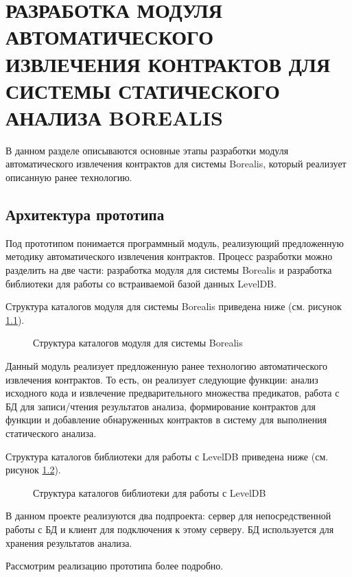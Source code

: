 \chapter{РАЗРАБОТКА МОДУЛЯ АВТОМАТИЧЕСКОГО ИЗВЛЕЧЕНИЯ КОНТРАКТОВ ДЛЯ СИСТЕМЫ СТАТИЧЕСКОГО АНАЛИЗА BOREALIS}
\label{chapter:developing}
В данном разделе описываются основные этапы разработки модуля автоматического извлечения контрактов для системы Borealis, который реализует описанную ранее технологию.

\section{Архитектура прототипа}
Под прототипом понимается программный модуль, реализующий предложенную методику автоматического извлечения контрактов. Процесс разработки можно разделить на две части: разработка модуля для системы Borealis и разработка библиотеки для работы со встраиваемой базой данных LevelDB\cite{leveldb}.

Структура каталогов модуля для системы Borealis приведена ниже (см. рисунок \ref{image:borealisStructure}).
\begin{figure}[h!]
\caption{Структура каталогов модуля для системы Borealis}
\label{image:borealisStructure}
\end{figure}

Данный модуль реализует предложенную ранее технологию автоматического извлечения контрактов. То есть, он реализует следующие функции: анализ исходного кода и извлечение предварительного множества предикатов, работа с БД для записи/чтения результатов анализа, формирование контрактов для функции и добавление обнаруженных контрактов в систему для выполнения статического анализа.

Структура каталогов библиотеки для работы с LevelDB приведена ниже (см. рисунок \ref{image:leveldbStructure}).
\begin{figure}[h!]
\caption{Структура каталогов библиотеки для работы с LevelDB}
\label{image:leveldbStructure}
\end{figure}

В данном проекте реализуются два подпроекта: сервер для непосредственной работы с БД и клиент для подключения к этому серверу. БД используется для хранения результатов анализа.

Рассмотрим реализацию прототипа более подробно.